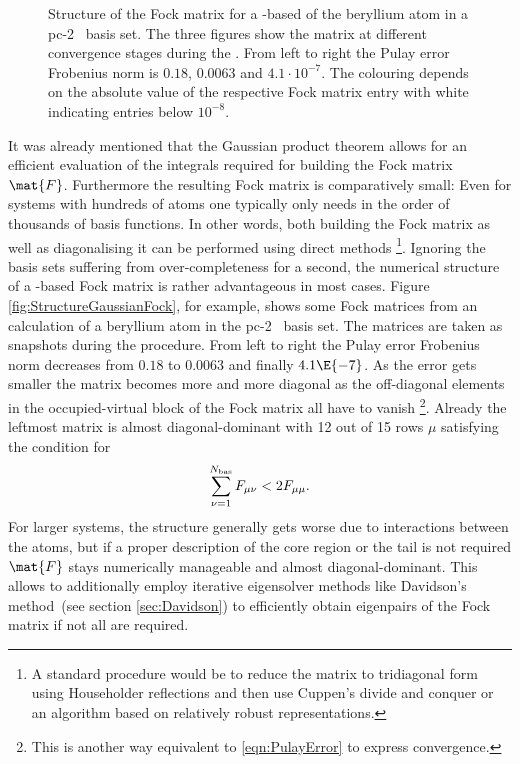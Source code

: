 \begin{figure}
	\centering
	\caption[Structure of the Fock matrix for a \cGTO-based \SCF]
		{Structure of the Fock matrix for a \cGTO-based \SCF
		of the beryllium atom
		in a pc-2~\cite{Jensen2007} basis set.
		The three figures show the matrix
		at different convergence stages during the \SCF.
		From left to right the Pulay error
		Frobenius norm is $0.18$, $0.0063$ and $4.1 \cdot 10^{-7}$.
		The colouring depends on the absolute value
		of the respective Fock matrix entry
		with white indicating entries below $10^{-8}$.
	}
	\label{fig:StructureGaussianFock}
\end{figure}
It was already mentioned that the Gaussian product theorem
allows for an efficient evaluation of the integrals
required for building the Fock matrix $\mat{F}$.
Furthermore the resulting Fock matrix is comparatively small:
Even for systems with hundreds of atoms one typically only needs
in the order of thousands of basis functions.
In other words, both building the Fock matrix
as well as diagonalising it can be performed using direct methods%
\noindent
\footnote{%
	A standard procedure would be to reduce the matrix to
	tridiagonal form using Householder reflections
	and then use Cuppen's divide and conquer
	or an algorithm based on relatively robust representations.
}.
Ignoring the basis sets suffering from over-completeness for a second,
the numerical structure of a \cGTO-based Fock matrix
is rather advantageous in most cases.
Figure \vref{fig:StructureGaussianFock}, for example,
shows some Fock matrices from an \SCF calculation
of a beryllium atom
in the pc-2~\cite{Jensen2007} basis set.
The matrices are taken as snapshots during the \SCF procedure.
From left to right the Pulay error Frobenius norm decreases
from $0.18$ to $0.0063$ and finally $4.1\E{-7}$.
As the error gets smaller the matrix becomes more and more diagonal
as the off-diagonal elements in the occupied-virtual block of the
Fock matrix all have to vanish%
\footnote{This is another way equivalent to \eqref{eqn:PulayError}
to express \SCF convergence.}.
Already the leftmost matrix is almost diagonal-dominant with 12
out of 15 rows $\mu$
satisfying the condition for 
\[
	\sum_{\nu=1}^{N_\text{bas}} F_{\mu\nu} < 2 F_{\mu\mu}.
\]
For larger systems, the structure generally gets
worse due to interactions between the atoms,
but if a proper description of the core region or the tail is not required
$\mat{F}$ stays numerically manageable and almost diagonal-dominant.
This allows to additionally employ
iterative eigensolver methods like Davidson's method~(see section \vref{sec:Davidson})
to efficiently obtain eigenpairs of the Fock matrix if not all are required.

